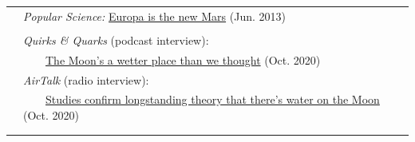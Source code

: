 \documentclass[letterpaper,10pt,twoside]{article}
\begin{document}
\begin{tabular}{@{} l l}
 & \textit{Popular Science:} \href{https://www.popsci.com/science/article/2013-06/europa-fiction/}{Europa is the new Mars} (Jun. 2013)\\
 & \\
 & \textit{Quirks \& Quarks} (podcast interview):\\
 &~~~~\href{https://www.cbc.ca/radio/quirks/oct-31-wasps-make-cockroaches-into-zombies-water-on-the-moon-how-remoras-surf-whales-and-more-1.5781814/the-moon-s-a-wetter-place-than-we-thought-and-that-could-be-critical-for-exploration-1.5781834}{The Moon's a wetter place than we thought} (Oct. 2020)\\
 & \textit{AirTalk} (radio interview):\\
 &~~~~\href{https://www.kpcc.org/show/airtalk/2020-10-27/studies-confirm-longstanding-theory-that-theres-water-on-the-moon-why-does-it-matter}{Studies confirm longstanding theory that there's water on the Moon} (Oct. 2020)\\
 & \\
 & \\
\end{tabular}

\vspace{0.05in}
\end{document}
